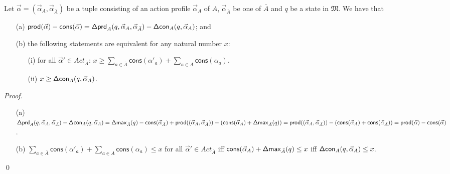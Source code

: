 \documentclass{llncs}
\newcommand{\Act}{Act}
\renewcommand{\model}{\ensuremath{\mathfrak{M}}\xspace}
\newcommand{\production}{\mathsf{prod}}
\newcommand{\consumption}{\mathsf{cons}}
\begin{document}
{\begin{lemma}\label{lemma:prod}
Let $\vec{\alpha}=(\vec{\alpha}_A,\vec{\alpha}_{\bar{A}})$ be a tuple consisting of an action profile $\vec{\alpha}_A$ of $A$,  $\vec{\alpha}_{\bar{A}}$ be one of $\bar{A}$ and  $q$ be a state in $\model$. We have that 
\begin{itemize}
\item[(a)] $\production(\vec{\alpha})-\consumption(\vec{\alpha})=\prd_A(q,\vec{\alpha}_A,\vec{\alpha}_{\bar{A}})-\con_A(q,\vec{\alpha}_A)$; and
\item[(b)]the following statements are equivalent for any natural number $x$: 
\begin{itemize}
\item[(i)] for all $\vec{\alpha}'\in \Act_{\bar{A}}$: $x \geq \sum_{a \in \bar{A}}\consumption(\alpha'_a)+\sum_{a \in A}\consumption(\alpha_a)$.
\item[(ii)] $x\geq  \mathsf{\Delta{}con}_A(q,\vec{\alpha}_A)$.
\end{itemize}
\end{itemize}
\end{lemma}
\begin{proof}
\begin{itemize}
\item[(a)] $\prd_A(q,\vec{\alpha}_A,\vec{\alpha}_{\bar{A}})-\con_A(q,\vec{\alpha}_A) = 
     \mn_{\bar A}(q)-\consumption(\vec{\alpha}_{\bar{A}})+\production((\vec{\alpha}_A,\linebreak\vec{\alpha}_{\bar{A}})) - 
     (\consumption(\vec{\alpha}_A)+\mn_{\bar A}(q)) = 
      \production((\vec{\alpha}_A,\vec{\alpha}_{\bar{A}})) - (\consumption(\vec{\alpha}_A)+\consumption(\vec{\alpha}_{\bar{A}}))=
      \production(\vec{\alpha})-\consumption(\vec{\alpha})$.
\item[(b)] $\sum_{a \in \bar{A}}\consumption(\alpha'_a)+\sum_{a \in A}\consumption(\alpha_a) \leq x$ for all $\vec{\alpha}'\in \Act_{\bar{A}}$
 iff 
 $\consumption(\vec{\alpha}_A)+\mn_{\bar A}(q)\linebreak \leq x$  iff  $\mathsf{\Delta{}con}_A(q,\vec{\alpha}_A) \leq x$.
\end{itemize}\qed
\end{proof}
}
\end{document}
